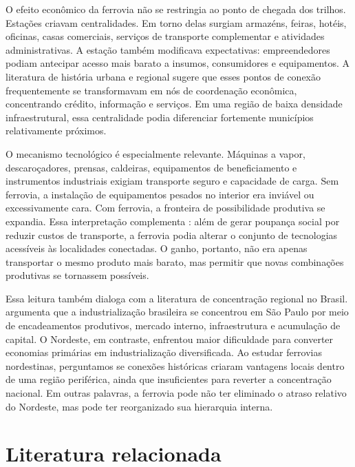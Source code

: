 \documentclass[12pt,a4paper]{article}
\begin{document}
O efeito econômico da ferrovia não se restringia ao ponto de chegada dos trilhos. Estações criavam centralidades. Em torno delas surgiam armazéns, feiras, hotéis, oficinas, casas comerciais, serviços de transporte complementar e atividades administrativas. A estação também modificava expectativas: empreendedores podiam antecipar acesso mais barato a insumos, consumidores e equipamentos. A literatura de história urbana e regional sugere que esses pontos de conexão frequentemente se transformavam em nós de coordenação econômica, concentrando crédito, informação e serviços. Em uma região de baixa densidade infraestrutural, essa centralidade podia diferenciar fortemente municípios relativamente próximos.

O mecanismo tecnológico é especialmente relevante. Máquinas a vapor, descaroçadores, prensas, caldeiras, equipamentos de beneficiamento e instrumentos industriais exigiam transporte seguro e capacidade de carga. Sem ferrovia, a instalação de equipamentos pesados no interior era inviável ou excessivamente cara. Com ferrovia, a fronteira de possibilidade produtiva se expandia. Essa interpretação complementa \citet{summerhill2005}: além de gerar poupança social por reduzir custos de transporte, a ferrovia podia alterar o conjunto de tecnologias acessíveis às localidades conectadas. O ganho, portanto, não era apenas transportar o mesmo produto mais barato, mas permitir que novas combinações produtivas se tornassem possíveis.

Essa leitura também dialoga com a literatura de concentração regional no Brasil. \citet{cano1977} argumenta que a industrialização brasileira se concentrou em São Paulo por meio de encadeamentos produtivos, mercado interno, infraestrutura e acumulação de capital. O Nordeste, em contraste, enfrentou maior dificuldade para converter economias primárias em industrialização diversificada. Ao estudar ferrovias nordestinas, perguntamos se conexões históricas criaram vantagens locais dentro de uma região periférica, ainda que insuficientes para reverter a concentração nacional. Em outras palavras, a ferrovia pode não ter eliminado o atraso relativo do Nordeste, mas pode ter reorganizado sua hierarquia interna.

\section{Literatura relacionada}
\end{document}
